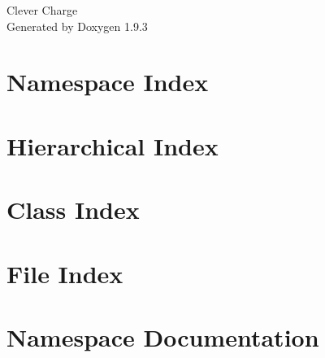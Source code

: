 \documentclass[twoside]{book}
\newcommand{\+}{\discretionary{\mbox{\scriptsize$\hookleftarrow$}}{}{}}
\newcommand{\clearemptydoublepage}{%
    \newpage{\pagestyle{empty}\cleardoublepage}%
  }
\begin{document}
  \raggedbottom
    \hypersetup{pageanchor=false,
                bookmarksnumbered=true,
                pdfencoding=unicode
               }
  \begin{titlepage}
  \vspace*{7cm}
  \begin{center}%
  {\Large Clever Charge}\\
  \vspace*{1cm}
  {\large Generated by Doxygen 1.9.3}\\
  \end{center}
  \end{titlepage}
  \clearemptydoublepage
  \tableofcontents
  \clearemptydoublepage
  \hypersetup{pageanchor=true}
\chapter{Namespace Index}

\chapter{Hierarchical Index}

\chapter{Class Index}

\chapter{File Index}

\chapter{Namespace Documentation}







\end{document}

